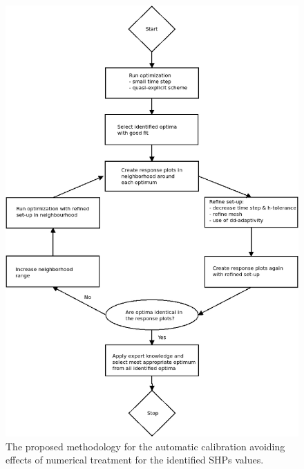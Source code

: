 \documentclass[review,times,3p,twocolumn,10pt]{elsarticle}
\begin{document}
\begin{figure}
\centering
\includegraphics[width=12cm]{flowchart/Flow_chart_cb_new.png}
\caption{The proposed methodology for the automatic calibration avoiding effects of numerical treatment for the identified SHPs values.}
\label{flowchart}
\end{figure}
\end{document}
